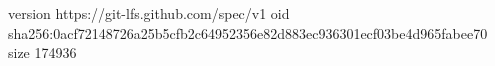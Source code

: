 version https://git-lfs.github.com/spec/v1
oid sha256:0acf72148726a25b5cfb2c64952356e82d883ec936301ecf03be4d965fabee70
size 174936
